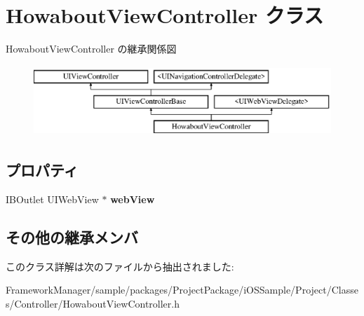 \hypertarget{interface_howabout_view_controller}{}\section{Howabout\+View\+Controller クラス}
\label{interface_howabout_view_controller}
Howabout\+View\+Controller の継承関係図\begin{figure}[H]
\begin{center}
\leavevmode
\includegraphics[height=2.654028cm]{interface_howabout_view_controller}
\end{center}
\end{figure}
\subsection*{プロパティ}
\begin{DoxyCompactItemize}
\item 
\hypertarget{interface_howabout_view_controller_aff96fe6f76f56563401633826a73e4a8}{}I\+B\+Outlet U\+I\+Web\+View $\ast$ {\bfseries web\+View}\label{interface_howabout_view_controller_aff96fe6f76f56563401633826a73e4a8}

\end{DoxyCompactItemize}
\subsection*{その他の継承メンバ}


このクラス詳解は次のファイルから抽出されました\+:\begin{DoxyCompactItemize}
\item 
Framework\+Manager/sample/packages/\+Project\+Package/i\+O\+S\+Sample/\+Project/\+Classes/\+Controller/Howabout\+View\+Controller.\+h\end{DoxyCompactItemize}
